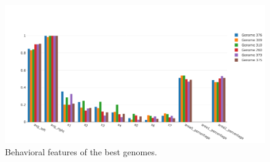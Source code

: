 \begin{figure}[H]
    \centering
    \includegraphics[width=12cm]{include/images/sim_behavioral_features_best.PNG}
    \caption{Behavioral features of the best genomes.}
    \label{fig:sim_behavioral_features_best}
\end{figure}

